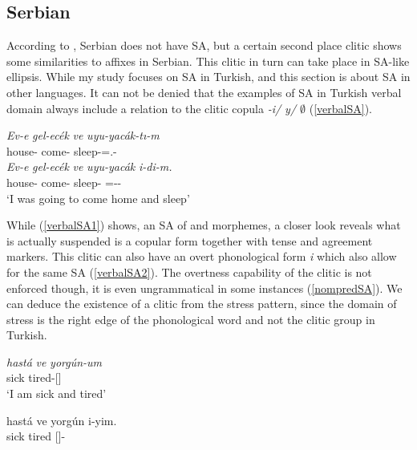 \subsection{Serbian}

According to \cite{despic2017suspended}, Serbian does not have SA, but a certain second place clitic shows some similarities to affixes in Serbian. This clitic in turn can take place in SA-like ellipsis. While my study focuses on SA in Turkish, and this section is about SA in other languages. It can not be denied that the examples of SA in Turkish verbal domain always include a relation to the clitic copula \textit{-i/ y/ $\emptyset$} (\ref{verbalSA}).

\begin{exe}
    \ex \label{verbalSA}
    \begin{xlist}
        \ex \label{verbalSA1}
        \gll 
        \textit{Ev-e} \textit{gel-ec\'{e}k} \textit{ve} \textit{uyu-yac\'{a}k-tı-m} \\ house-{\Dat} come-{\Fut} {\And} sleep-{\Fut}={\Cop}.{\Pst}-{\Fsg} \\
        
        \ex \label{verbalSA2}
        \gll 
        \textit{Ev-e} \textit{gel-ec\'{e}k} \textit{ve} \textit{uyu-yac\'{a}k} \textit{i-di-m.} \\ house-{\Dat} come-{\Fut} {\And} sleep-{\Fut} ={\Cop}-{\Pst}-{\Fsg} \\
        \glt `I was going to come home and sleep'
    \end{xlist}
\end{exe}

While (\ref{verbalSA1}) shows, an SA of {\Pst} and {\Agr} morphemes, a closer look reveals what is actually suspended is a copular form together with tense and agreement markers. This clitic can also have an overt phonological form \textit{i} which also allow for the same SA (\ref{verbalSA2}). The overtness capability of the clitic is not enforced though, it is even ungrammatical in some instances (\ref{nompredSA}). We can deduce the existence of a clitic from the stress pattern, since the domain of stress is the right edge of the phonological word and not the clitic group in Turkish.

\begin{exe}
    \ex \label{nompredSA}
    \begin{xlist}
        \ex \gll 
        \textit{hast\'{a}} \textit{ve} \textit{yorg\'{u}n-um} \\ sick {\And} tired-{\Fsg}[{\Prs}] \\
        \glt `I am sick and tired'
        
        \ex \gll *hast\'{a} ve yorg\'{u}n i-yim. \\ sick {\And} tired {\Cop}[{\Prs}]-{\Fsg} \\
    \end{xlist}
\end{exe}

